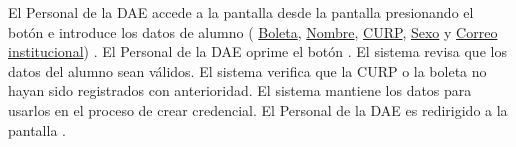 \begin{UCtrayectoria}

    \UCpaso[\UCactor] El Personal de la DAE accede a la pantalla \label{CU21.introduceDatos} desde la pantalla  presionando el botón  e introduce los datos de alumno ( \hyperlink{Alumno.Boleta}{Boleta}, \hyperlink{Alumno.Nombre}{Nombre}, \hyperlink{Alumno.CURP}{CURP}, \hyperlink{Alumno.Sexo}{Sexo} y \hyperlink{Alumno.Correo institucional}{Correo institucional}) .
    \UCpaso[\UCactor] El Personal de la DAE oprime el botón .
    \UCpaso El sistema revisa que los datos del alumno sean válidos.
    \UCpaso El sistema verifica que la CURP o la boleta no hayan sido registrados con anterioridad.
    \UCpaso El sistema mantiene los datos para usarlos en el proceso de crear credencial.
    \UCpaso[\UCactor] El Personal de la DAE es redirigido a la pantalla .

\end{UCtrayectoria}
